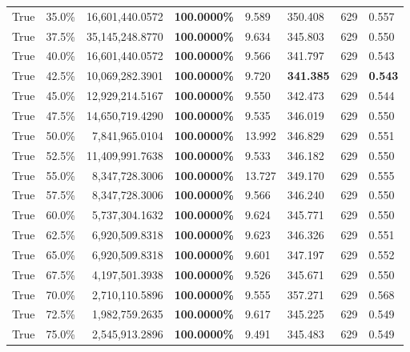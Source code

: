 \begin{table}[H]
\begin{tabular}{|m{}| m{}| r | R{0.13\textwidth}| R{0.09\textwidth}| R{0.09\textwidth}| R{0.09\textwidth}| R{0.11\textwidth}|}
True & 35.0\% & 16,601,440.0572 & \bfseries \color{red} 100.0000\% & 9.589 & 350.408 & 629 & 0.557 \\
True & 37.5\% & 35,145,248.8770 & \bfseries \color{red} 100.0000\% & 9.634 & 345.803 & 629 & 0.550 \\
True & 40.0\% & 16,601,440.0572 & \bfseries \color{red} 100.0000\% & 9.566 & 341.797 & 629 & 0.543 \\
True & 42.5\% & 10,069,282.3901 & \bfseries \color{red} 100.0000\% & 9.720 & \bfseries \color{red} 341.385 & 629 & \bfseries \color{red} 0.543 \\
True & 45.0\% & 12,929,214.5167 & \bfseries \color{red} 100.0000\% & 9.550 & 342.473 & 629 & 0.544 \\
True & 47.5\% & 14,650,719.4290 & \bfseries \color{red} 100.0000\% & 9.535 & 346.019 & 629 & 0.550 \\
True & 50.0\% & 7,841,965.0104 & \bfseries \color{red} 100.0000\% & 13.992 & 346.829 & 629 & 0.551 \\
True & 52.5\% & 11,409,991.7638 & \bfseries \color{red} 100.0000\% & 9.533 & 346.182 & 629 & 0.550 \\
True & 55.0\% & 8,347,728.3006 & \bfseries \color{red} 100.0000\% & 13.727 & 349.170 & 629 & 0.555 \\
True & 57.5\% & 8,347,728.3006 & \bfseries \color{red} 100.0000\% & 9.566 & 346.240 & 629 & 0.550 \\
True & 60.0\% & 5,737,304.1632 & \bfseries \color{red} 100.0000\% & 9.624 & 345.771 & 629 & 0.550 \\
True & 62.5\% & 6,920,509.8318 & \bfseries \color{red} 100.0000\% & 9.623 & 346.326 & 629 & 0.551 \\
True & 65.0\% & 6,920,509.8318 & \bfseries \color{red} 100.0000\% & 9.601 & 347.197 & 629 & 0.552 \\
True & 67.5\% & 4,197,501.3938 & \bfseries \color{red} 100.0000\% & 9.526 & 345.671 & 629 & 0.550 \\
True & 70.0\% & 2,710,110.5896 & \bfseries \color{red} 100.0000\% & 9.555 & 357.271 & 629 & 0.568 \\
True & 72.5\% & 1,982,759.2635 & \bfseries \color{red} 100.0000\% & 9.617 & 345.225 & 629 & 0.549 \\
True & 75.0\% & 2,545,913.2896 & \bfseries \color{red} 100.0000\% & 9.491 & 345.483 & 629 & 0.549 \\

\end{tabular}
\end{table}

